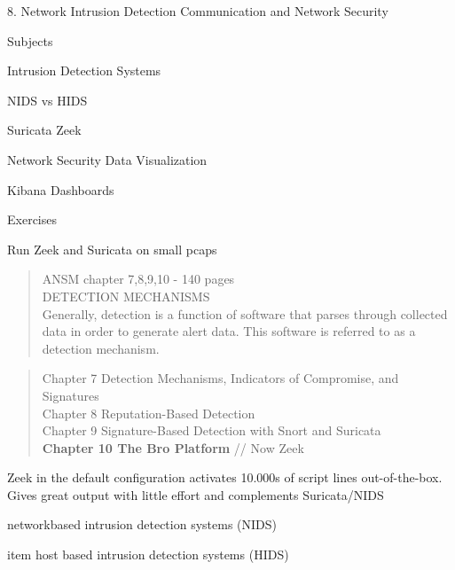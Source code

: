 \documentclass[Screen16to9,17pt]{foils}
\begin{document}
\mytitlepage
{8. Network Intrusion Detection}
{Communication and Network Security \the\year}




\begin{list1}
\item Subjects
\begin{list2}
\item Intrusion Detection Systems
\item NIDS vs HIDS
\item Suricata Zeek
\item Network Security Data Visualization
\item Kibana Dashboards
\end{list2}
\item Exercises
\begin{list2}
\item Run Zeek and Suricata on small pcaps
\end{list2}
\end{list1}



\begin{quote}
ANSM chapter 7,8,9,10 - 140 pages\\
DETECTION MECHANISMS\\
Generally, detection is a function of software that parses through collected data in order to generate alert data. This software is referred to as a detection mechanism.
\end{quote}

\begin{quote}
Chapter 7 Detection Mechanisms, Indicators of Compromise, and Signatures\\
Chapter 8 Reputation-Based Detection\\
Chapter 9 Signature-Based Detection with Snort and Suricata\\{\bf
Chapter 10 The Bro Platform} // Now Zeek
\end{quote}

Zeek in the default configuration activates 10.000s of script lines out-of-the-box.\\
Gives great output with little effort and complements Suricata/NIDS


\begin{list2}
\item networkbased intrusion detection systems (NIDS)
\item item host based intrusion detection systems (HIDS)
\end{list2}
\end{document}
